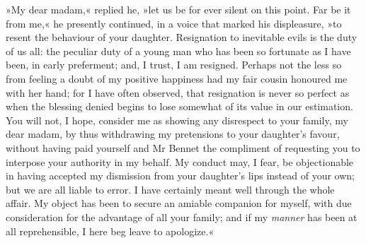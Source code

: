»My dear madam,« replied he, »let us be for ever silent on this point. Far be it from me,« he presently continued, in a voice that marked his displeasure, »to resent the behaviour of your daughter. Resignation to inevitable evils is the duty of us all: the peculiar duty of a young man who has been so fortunate as I have been, in early preferment; and, I trust, I am resigned. Perhaps not the less so from feeling a doubt of my positive happiness had my fair cousin honoured me with her hand; for I have often observed, that resignation is never so perfect as when the blessing denied begins to lose somewhat of its value in our estimation. You will not, I hope, consider me as showing any disrespect to your family, my dear madam, by thus withdrawing my pretensions to your daughter's favour, without having paid yourself and Mr Bennet the compliment of requesting you to interpose your authority in my behalf. My conduct may, I fear, be objectionable in having accepted my dismission from your daughter's lips instead of your own; but we are all liable to error. I have certainly meant well through the whole affair. My object has been to secure an amiable companion for myself, with due consideration for the advantage of all your family; and if my \textit{manner} has been at all reprehensible, I here beg leave to apologize.«

